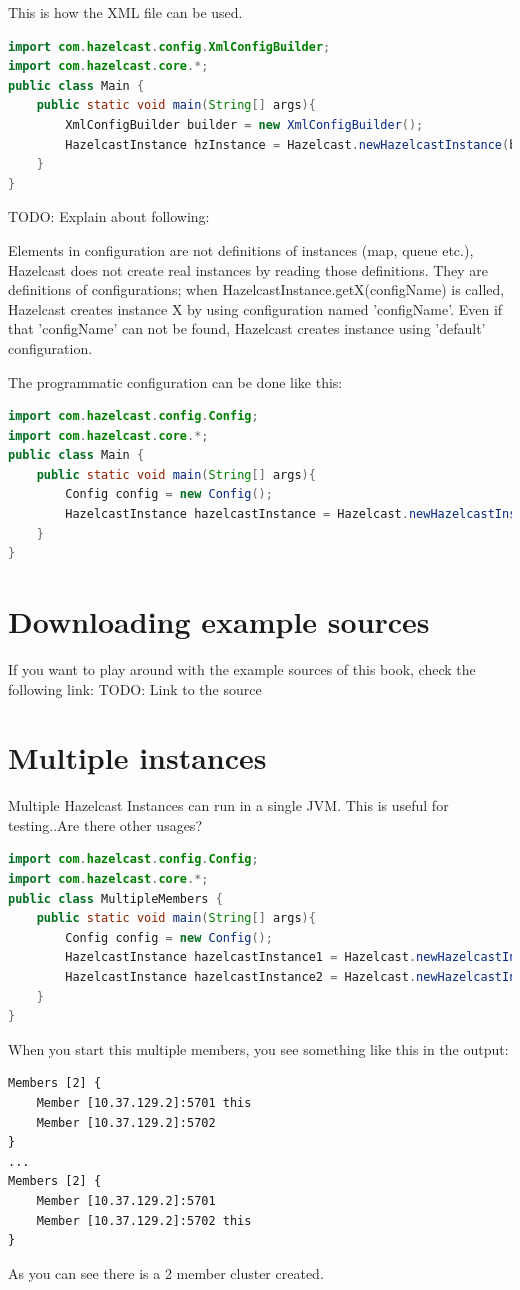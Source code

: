 This is how the XML file can be used.
\begin{lstlisting}[language=java]
import com.hazelcast.config.XmlConfigBuilder;
import com.hazelcast.core.*;
public class Main {
    public static void main(String[] args){
        XmlConfigBuilder builder = new XmlConfigBuilder();
        HazelcastInstance hzInstance = Hazelcast.newHazelcastInstance(builder.build());
    }
}
\end{lstlisting}

TODO: Explain about following:

Elements in configuration are not definitions of instances (map, queue etc.), Hazelcast does not create real instances by reading those definitions. They are definitions of configurations; when HazelcastInstance.getX(configName) is called, Hazelcast creates instance X by using configuration named 'configName'. Even if that 'configName' can not be found, Hazelcast creates instance using 'default' configuration.

The programmatic configuration can be done like this:

\begin{lstlisting}[language=java]
import com.hazelcast.config.Config;
import com.hazelcast.core.*;
public class Main {
    public static void main(String[] args){
        Config config = new Config();
        HazelcastInstance hazelcastInstance = Hazelcast.newHazelcastInstance(config);
    }
}
\end{lstlisting}

\section{Downloading example sources}
If you want to play around with the example sources of this book, check the following link:
TODO: Link to the source

\section{Multiple instances}
Multiple Hazelcast Instances can run in a single JVM. This is useful for testing..Are there other usages?

\begin{lstlisting}[language=java]
import com.hazelcast.config.Config;
import com.hazelcast.core.*;
public class MultipleMembers {
    public static void main(String[] args){
        Config config = new Config();
        HazelcastInstance hazelcastInstance1 = Hazelcast.newHazelcastInstance(config);
        HazelcastInstance hazelcastInstance2 = Hazelcast.newHazelcastInstance(config);
    }
}
\end{lstlisting}
When you start this multiple members, you see something like this in the output:
\begin{verbatim}
Members [2] {
    Member [10.37.129.2]:5701 this
    Member [10.37.129.2]:5702
}
...
Members [2] {
    Member [10.37.129.2]:5701
    Member [10.37.129.2]:5702 this
}
\end{verbatim}
As you can see there is a 2 member cluster created.

